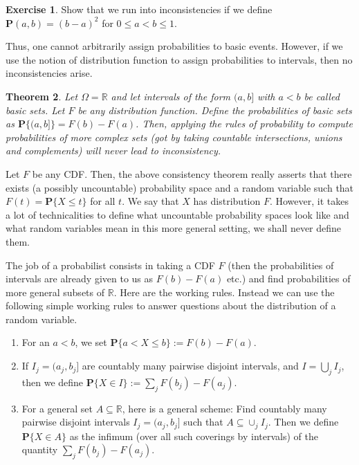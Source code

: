\documentclass[preprint,  11pt]{amsart}
\theoremstyle{plain} %
\newtheorem{theorem}{Theorem}
\theoremstyle{definition} %
\newtheorem{exercise}[theorem]{Exercise}
\begin{document}
{{{{{{{{{{{{{{{{{{\begin{exercise} Show that we run into inconsistencies if we define $\mathbf{P}(a,b)=(b-a)^{2}$ for $0\le a<b\le 1$.
\end{exercise}

Thus, one cannot arbitrarily assign probabilities to basic events. However, if we use the notion of distribution function to assign probabilities to intervals, then no inconsistencies arise.
\begin{theorem}\label{thm:consistencyofmeasures} Let $\Omega=\mathbb{R}$ and let intervals of the form $(a,b]$ with $a<b$ be called basic sets. Let $F$ be any distribution function. {\em Define} the probabilities of basic sets as $\mathbf{P}\{(a,b]\}=F(b)-F(a)$. Then, applying the rules of probability to compute probabilities of more complex sets (got by taking countable intersections, unions and complements) will never lead to inconsistency.
\end{theorem}
Let $F$ be any CDF. Then, the above consistency theorem really asserts that there exists (a possibly uncountable) probability space and a random variable such that $F(t)=\mathbf{P}\{X\le t\}$ for all $t$. We say that $X$ has distribution $F$. However, it takes a lot of technicalities to define what uncountable probability spaces look like and what random variables mean in this more general setting, we shall never define them.

The job of a probabilist consists in taking a CDF $F$ (then the probabilities of intervals are already given to us as $F(b)-F(a)$ etc.) and find probabilities of more general subsets of $\mathbb{R}$. Here are the working rules.  Instead we can use the following simple working rules to answer questions about the distribution of a random variable.
{\begin{enumerate}\setlength\itemsep{6pt}
\item For an $a<b$, we set $\mathbf{P}\{a<X\le b\}:=F(b)-F(a)$.
\item If $I_{j}=(a_{j},b_{j}]$ are countably many pairwise disjoint intervals, and $I=\bigcup_{j}I_{j}$, then we define $\mathbf{P}\{X\in I\}:=\sum_{j}F(b_{j})-F(a_{j})$.
\item For a general set $A\subseteq \mathbb{R}$, here is a general scheme: Find countably many pairwise disjoint intervals $I_{j}=(a_{j},b_{j}]$ such that $A\subseteq \cup_{j}I_{j}$. Then we define $\mathbf{P}\{X\in A\}$ as the infimum (over all such coverings by intervals) of the quantity $\sum_{j}F(b_{j})-F(a_{j})$.
\end{enumerate}

}}}}}}}}}}}}}}}}}}}
\end{document}
